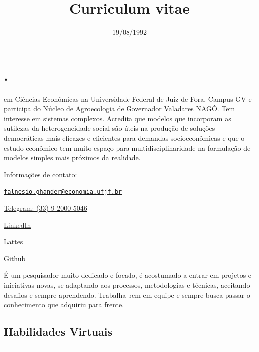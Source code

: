 \documentclass[justified]{tufte-book}
\title{Curriculum vitae}
\author{19/08/1992}
\date{}
\begin{document}
\maketitle



{
\setcounter{tocdepth}{1}
\tableofcontents
}

\hypertarget{section}{%
\chapter*{.}\label{section}}

 em Ciências Econômicas na Universidade Federal de Juiz de Fora, Campus GV e participa do Núcleo de Agroecologia de Governador Valadares NAGÔ. Tem interesse em sistemas complexos. Acredita que modelos que incorporam as sutilezas da heterogeneidade social são úteis na produção de soluções democráticas mais eficazes e eficientes para demandas socioeconômicas e que o estudo econômico tem muito espaço para multidisciplinaridade na formulação de modelos simples mais próximos da realidade.

\begin{marginfigure}
    Informações de contato:
    
    \href{mailto:falnesio.ghander@economia.ufjf.br}{\nolinkurl{falnesio.ghander@economia.ufjf.br}}
    
    \href{https://t.me/falnesio}{Telegram: (33) 9 2000-5046}
    
    \href{https://www.linkedin.com/in/faln\%C3\%A9sio-g-s-borges-43b615149/}{LinkedIn}
    
    \href{http://lattes.cnpq.br/8513885038003903}{Lattes}
    
    \href{https://github.com/Falnesio}{Github}
    \end{marginfigure}

É um pesquisador muito dedicado e focado, é acostumado a entrar em projetos e iniciativas novas, se adaptando aos processos, metodologias e técnicas, aceitando desafios e sempre aprendendo. Trabalha bem em equipe e sempre busca passar o conhecimento que adquiriu para frente.

\hypertarget{habilidades-virtuais}{%
\section{Habilidades Virtuais}\label{habilidades-virtuais}}

\begin{center}\rule{0.5\linewidth}{\linethickness}\end{center}
\end{document}
